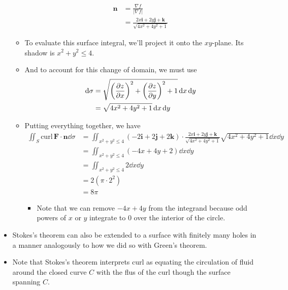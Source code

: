 \documentclass[../main.tex]{subfiles}
\begin{document}
\begin{itemize}
\begin{itemize}
        \begin{align*}
            \mathbf{n} &= \frac{\nabla f}{|\nabla f|}\\
            &= \frac{2x\mathbf{i}+2y\mathbf{j}+\mathbf{k}}{\sqrt{4x^2+4y^2+1}}
        \end{align*}
        \item To evaluate this surface integral, we'll project it onto the $xy$-plane. Its shadow is $x^2+y^2\leq 4$.
        \item And to account for this change of domain, we must use
        \begin{align*}
            \dd{\sigma} &= \sqrt{\left( \pdv{z}{x} \right)^2+\left( \pdv{z}{y} \right)^2+1}\dd{x}\dd{y}\\
            &= \sqrt{4x^2+4y^2+1}\dd{x}\dd{y}
        \end{align*}
        \item Putting everything together, we have
        \begin{align*}
            \iint_S\text{curl}\,\mathbf{F}\cdot\mathbf{n}\dd{\sigma} &= \iint_{x^2+y^2\leq 4}(-2\mathbf{i}+2\mathbf{j}+2\mathbf{k})\cdot\frac{2x\mathbf{i}+2y\mathbf{j}+\mathbf{k}}{\sqrt{4x^2+4y^2+1}}\sqrt{4x^2+4y^2+1}\dd{x}\dd{y}\\
            &= \iint_{x^2+y^2\leq 4}(-4x+4y+2)\dd{x}\dd{y}\\
            &= \iint_{x^2+y^2\leq 4}2\dd{x}\dd{y}\\
            &= 2(\pi\cdot 2^2)\\
            &= 8\pi
        \end{align*}
        \begin{itemize}
            \item Note that we can remove $-4x+4y$ from the integrand because odd powers of $x$ or $y$ integrate to 0 over the interior of the circle.
        \end{itemize}
    \end{itemize}
    \item Stokes's theorem can also be extended to a surface with finitely many holes in a manner analogously to how we did so with Green's theorem.
    \item Note that Stokes's theorem interprets curl as equating the circulation of fluid around the closed curve $C$ with the flus of the curl though the surface spanning $C$.
\end{itemize}
\end{document}
